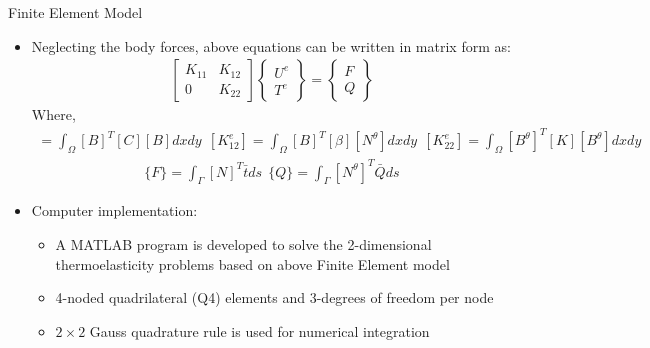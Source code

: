 \documentclass{beamer}
\begin{document}
\begin{frame}[t,fragile]{Finite Element Model}
    \vspace{-.3cm}
    \footnotesize
    \begin{itemize}
         \item Neglecting the body forces, above equations can be written in matrix form as: 
    \begin{align*}
\begin{bmatrix}
    K_{11} & K_{12} \\
    0 & K_{22}
\end{bmatrix}
\begin{Bmatrix}
    U^e\\ T^e
\end{Bmatrix}=
\begin{Bmatrix}
    F\\ Q
\end{Bmatrix}
\end{align*} 
Where,
\vspace{-.2cm}
    \scriptsize 
\begin{align*}
    [K_{11}^e]=\int_{\Omega}[B]^T[C][B]dxdy\ \
    [K_{12}^e]=\int_{\Omega}[B]^T[\beta][N^{\theta}]dxdy\ \
    [K_{22}^e]=\int_{\Omega}[B^{\theta}]^T[K][B^{\theta}]dxdy
\end{align*}
\vspace{-.5cm}
\begin{align*}
    \{F\}=\int_\Gamma [N]^T{\bar{t}}ds\ \
    \{Q\}=\int_\Gamma [N^{\theta}]^T\bar{Q}ds
\end{align*} \onslide<4->
\item \large{Computer implementation:}
    \begin{itemize}
\footnotesize
     \onslide<5->   \item A MATLAB program is developed to solve the 2-dimensional thermoelasticity problems based on above Finite Element model 
     \onslide<6->   \item 4-noded quadrilateral (Q4) elements and 3-degrees of freedom per node 
      \onslide<7->  \item  $2\times 2$ Gauss quadrature rule is used for numerical integration
    \end{itemize}
\end{itemize}
\end{frame}
\end{document}
